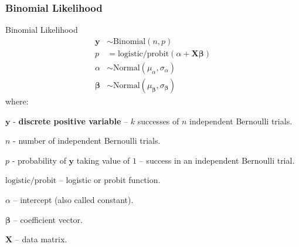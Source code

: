 \subsubsection{Binomial Likelihood}
\begin{frame}{Binomial Likelihood}
    \small
    $$
        \begin{aligned}
            \mathbf{y}         & \sim \text{Binomial}\left(n,  p\right)                                    \\
            p                  & = \text{logistic/probit}(\alpha +  \mathbf{X} \boldsymbol{\beta})         \\
            \alpha             & \sim \text{Normal}(\mu_\alpha, \sigma_\alpha)                             \\
            \boldsymbol{\beta} & \sim \text{Normal}(\mu_{\boldsymbol{\beta}}, \sigma_{\boldsymbol{\beta}})
        \end{aligned}
    $$
    where:
    \begin{vfilleditems}
        \item \small $\mathbf{y}$ - \textbf{discrete positive variable} -- $k$ successes of $n$ independent Bernoulli trials.
        \item \small $n$ - number of independent Bernoulli trials.
        \item \small $p$ - probability of $\mathbf{y}$ taking value of $1$ --
        success in an independent Bernoulli trial.
        \item \small $\text{logistic/probit}$ -- logistic or probit function.
        \item \small $\alpha$ -- intercept (also called constant).
        \item \small $\boldsymbol{\beta}$ -- coefficient vector.
        \item \small $\mathbf{X}$ -- data matrix.
    \end{vfilleditems}
\end{frame}